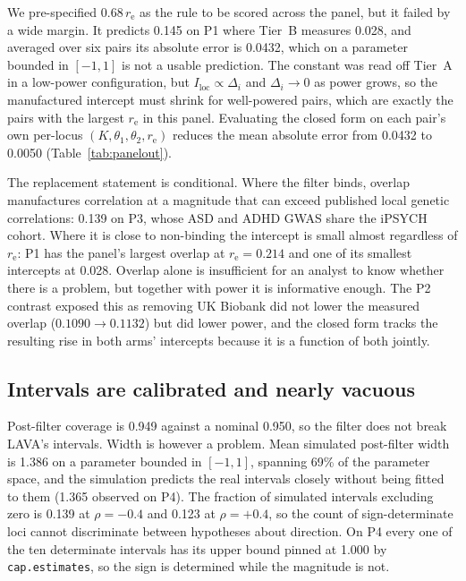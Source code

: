 \documentclass[12pt,a4paper]{article}
\newcommand{\Ilocus}{I_{\mathrm{loc}}}
\newcommand{\re}{r_{\mathrm{e}}}
\begin{document}
We pre-specified $0.68\,\re$ as the rule to be scored across the panel, but it failed by
a wide margin. It predicts 0.145 on P1 where Tier~B measures 0.028, and averaged over six
pairs its absolute error is 0.0432, which on a parameter bounded in $[-1,1]$ is not a
usable prediction. The constant was read
off Tier~A in a low-power configuration, but $\Ilocus\propto\Delta_i$ and $\Delta_i\to0$
as power grows, so the manufactured intercept must shrink for well-powered pairs, which
are exactly the pairs with the largest $\re$ in this panel. Evaluating the closed form on
each pair's own per-locus $(K,\theta_1,\theta_2,\re)$ reduces the mean absolute error from
0.0432 to 0.0050 (Table~\ref{tab:panelout}).

The replacement statement is conditional. Where the
filter binds, overlap manufactures correlation at a magnitude that can exceed published
local genetic correlations: 0.139 on P3, whose ASD and ADHD GWAS share the iPSYCH cohort.
Where it is close to non-binding the intercept is small almost regardless of $\re$: P1 has
the panel's largest overlap at $\re=0.214$ and one of its smallest intercepts at 0.028.
Overlap alone is insufficient for an analyst to know whether there is a problem, but
together with power it is informative enough. The P2 contrast exposed this as removing UK
Biobank did not lower the measured overlap ($0.1090\to0.1132$) but did lower power, and the
closed form tracks the resulting rise in both arms' intercepts because it is a function of
both jointly.

\subsection{Intervals are calibrated and nearly vacuous}\label{sec:intervals}

Post-filter coverage is 0.949 against a nominal 0.950, so the filter does not break
LAVA's intervals. Width is however a problem. Mean simulated post-filter width is 1.386 on
a parameter bounded in $[-1,1]$, spanning 69\% of the parameter space, and the simulation
predicts the real intervals closely without being fitted to them (1.365 observed on P4).
The fraction of simulated intervals excluding zero is 0.139 at $\rho=-0.4$ and 0.123 at
$\rho=+0.4$, so the count of sign-determinate loci cannot discriminate between hypotheses
about direction. On P4 every one of the ten determinate intervals
has its upper bound pinned at 1.000 by \texttt{cap.estimates}, so the sign is determined
while the magnitude is not.
\end{document}
